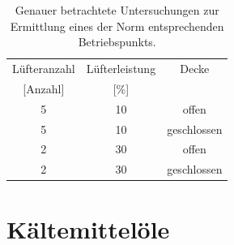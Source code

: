 \begin{table}[h!]
\centering
\caption{Genauer betrachtete Untersuchungen zur Ermittlung eines der Norm entsprechenden Betriebspunkts.}
\label{tab:Lüfterleistungen_eingegrenzt}
\begin{tabular}{|ccc|}
\hline
Lüfteranzahl            & Lüfterleistung          & Decke       \\
{[}Anzahl{]}            & {[}\%{]}                &             \\ \hline
\multicolumn{1}{|c|}{5} & \multicolumn{1}{c|}{10} & offen       \\
\multicolumn{1}{|c|}{5} & \multicolumn{1}{c|}{10} & geschlossen \\
\multicolumn{1}{|c|}{2} & \multicolumn{1}{c|}{30} & offen       \\
\multicolumn{1}{|c|}{2} & \multicolumn{1}{c|}{30} & geschlossen \\ \hline
\end{tabular}
\end{table}










\section{Kältemittelöle}
\label{sec:Kältemittelöleanalyse}

